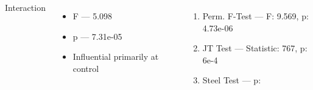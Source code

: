 \documentclass[17pt,margin=1in,innermargin=-4.5in,blockverticalspace=-0.25in]{tikzposter}
\begin{document}
\begin{columns}
{\begin{minipage}[t]{.5\linewidth}
{                \begin{minipage}[c]{.5\linewidth}
                    \begin{center}
                        Interaction
                    \end{center}
                    \begin{itemize}
                        \item F --- 5.098
                        \item p --- 7.31e-05
                        \item Influential primarily at control
                    \end{itemize}
                \end{minipage}\hfill\begin{minipage}[c]{.5\linewidth}
                    \begin{tikzfigure}
                        \centering
                        
                    \end{tikzfigure}
                \end{minipage}
                \begin{enumerate}
                    \item Perm. F-Test --- F: 9.569, p: 4.73e-06
                    \item JT Test --- Statistic: 767, p: 6e-4
                    \item Steel Test --- p:
                \end{enumerate}
            }
        \end{minipage}\hfill\begin{minipage}[t]{.5\linewidth}
\end{minipage}}
\end{columns}
\end{document}
